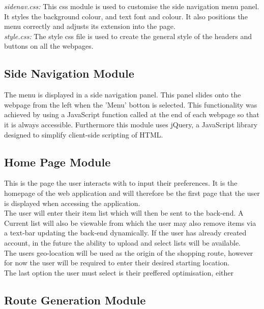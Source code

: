 \documentclass[10pt, a4paper, twocolumn]{scrartcl}
\begin{document}
		\textit{sidenav.css:} This css module is used to customise the side navigation menu panel. It styles the background colour, and text font and colour. It also positions the menu correctly and adjusts its extension into the page.\\
		
		\textit{style.css:} The style css file is used to create the general style of the headers and buttons on all the webpages.
		
		\subsection{Side Navigation Module}
		
		The menu is displayed in a side navigation panel. This panel slides onto the webpage from the left when the 'Menu' botton is selected. This functionality was achieved by using a JavaScript function called at the end of each webpage so that it is always accessible. Furthermore this module uses jQuery, a JavaScript library designed to simplify client-side scripting of HTML.	
		
		\subsection{Home Page Module}
		
		This is the page the user interacts with to input their preferences. It is the homepage of the web application and will therefore be the first page that the user is displayed when accessing the application.\\
		
		The user will enter their item list which will then be sent to the back-end. A Current list will also be viewable from which the user may also remove items via a text-bar updating the back-end dynamically. If the user has already created account, in the future the ability to upload and select lists will be available. \\
		
		The users geo-location will be used as the origin of the shopping route, however for now the user will be required to enter their desired starting location.\\
		
		The last option the user must select is their preffered optimisation, either
		
		\subsection{Route Generation Module}
		
\end{document}
